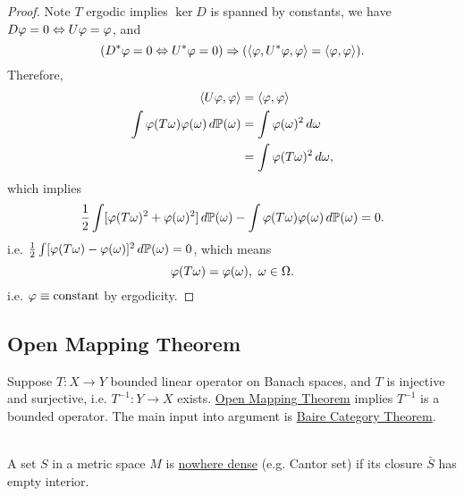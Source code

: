\begin{proof}
\np Note $T$ ergodic implies $\ker{D}$ is spanned by constants, we have $D \varphi = 0 \Leftrightarrow U\varphi = \varphi$, and
\begin{equation*}
    (D^* \varphi = 0 \Leftrightarrow U^* \varphi = 0) \Rightarrow (\left\langle \varphi, U^* \varphi, \varphi \right\rangle = \left\langle \varphi, \varphi \right\rangle). 
\end{equation*}
Therefore,
\begin{align*}
    \left\langle U \varphi, \varphi \right\rangle &= \left\langle \varphi, \varphi \right\rangle\\
    \int \varphi(T \omega) \varphi(\omega) \,d\mathbb{P}(\omega) &=\int \varphi(\omega)^2 \,d\omega\\
    &= \int \varphi(T \omega)^2 \,d\omega,
\end{align*}
which implies
\begin{equation*}
    \frac{1}{2} \int [\varphi(T \omega)^2 + \varphi(\omega)^2] \,d\mathbb{P}(\omega) - \int \varphi(T \omega) \varphi(\omega) \,d\mathbb{P}(\omega) = 0.
\end{equation*}
i.e. $\frac{1}{2} \int[\varphi(T \omega) - \varphi(\omega)]^2 \,d\mathbb{P}(\omega) = 0$, which means
\begin{equation*}
    \varphi(T \omega) = \varphi(\omega),\ \omega \in \Omega.
\end{equation*}
i.e. $\varphi \equiv \text{constant}$ by ergodicity.
\end{proof}

\vspace{12pt}
\subsection{Open Mapping Theorem}

\np Suppose $T: X \to Y$ bounded linear operator on Banach spaces, and $T$ is injective and surjective, i.e. $T^{-1}: Y \to X$ exists. \underline{Open Mapping Theorem} implies $T^{-1}$ is a bounded operator. The main input into argument is \underline{Baire Category Theorem}. 

\vspace{3pt}
\begin{definition}\ \\
A set $S$ in a metric space $M$ is \underline{nowhere dense} (e.g. Cantor set) if its closure $\bar{S}$ has empty interior. 
\end{definition}


